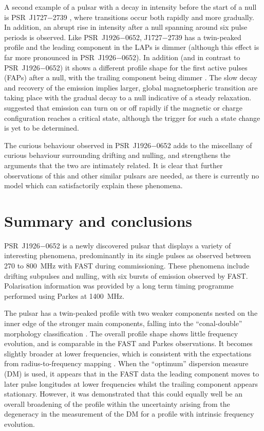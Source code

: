 A second example of a pulsar with a decay in intensity before the start of a null is PSR~J1727$-$2739 \citep{WWY+2016}, where transitions occur both rapidly and more gradually. In addition, an abrupt rise in intensity after a null spanning around six pulse periods is observed. Like PSR~J1926$-$0652, J1727$-$2739 has a twin-peaked profile and the leading component in the LAPs is dimmer (although this effect is far more pronounced in PSR~J1926$-$0652). In addition (and in contrast to PSR~J1926$-$0652) it shows a different profile shape for the first active pulses (FAPs) after a null, with the trailing component being dimmer \citep{WWY+2016}. The slow decay and recovery of the emission implies larger, global magnetospheric transition are taking place \citep{LHK+2010,MYxx2014} with the gradual decay to a null indicative of a steady relaxation. \citet{WMJx2007} suggested that emission can turn on or off rapidly if the magnetic or charge configuration reaches a critical state, although the trigger for such a state change is yet to be determined.

The curious behaviour observed in PSR~J1926$-$0652 adds to the miscellany of curious behaviour surrounding drifting and nulling, and strengthens the arguments that the two are intimately related. It is clear that further observations of this and other similar pulsars are needed, as there is currently no model which can satisfactorily explain these phenomena.




\section{Summary and conclusions}
\label{sec: J1926 - conclusions}


PSR~J1926$-$0652 is a newly discovered pulsar that displays a variety of interesting phenomena, predominantly in its single pulses as observed between 270 to 800~MHz with FAST during commissioning. These phenomena include drifting subpulses and nulling, with six bursts of emission observed by FAST. Polarisation information was provided by a long term timing programme performed using Parkes at 1400~MHz.

The pulsar has a twin-peaked profile with two weaker components nested on the inner edge of the stronger main components, falling into the ``conal-double'' morphology classification \citep{Rxxx1983a}. 
The overall profile shape shows little frequency evolution, and is comparable in the FAST and Parkes observations. It becomes slightly broader at lower frequencies, which is consistent with the expectations from radius-to-frequency mapping \citep[e.g.][]{Cxxx1978}. When the ``optimum'' dispersion measure (DM) is used, it appears that in the FAST data the leading component moves to later pulse longitudes at lower frequencies whilst the trailing component appears stationary. However, it was demonstrated that this could equally well be an overall broadening of the profile within the uncertainty arising from the degeneracy in the measurement of the DM for a profile with intrinsic frequency evolution.

